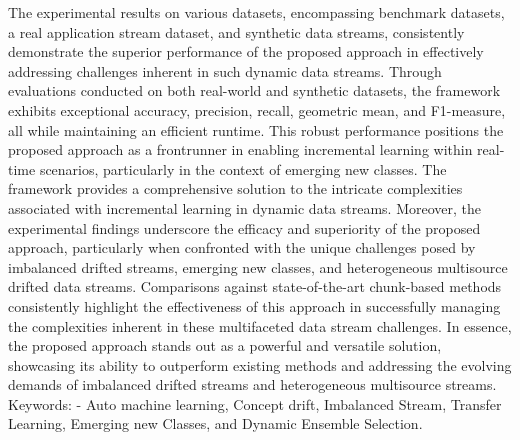 \begin{alwayssingle}
    The experimental results on various datasets, encompassing benchmark datasets, a real application stream dataset, and synthetic data streams, consistently demonstrate the superior performance of the proposed approach in effectively addressing challenges inherent in such dynamic data streams. Through evaluations conducted on both real-world and synthetic datasets, the framework exhibits exceptional accuracy, precision, recall, geometric mean, and F1-measure, all while maintaining an efficient runtime.
    This robust performance positions the proposed approach as a frontrunner in enabling incremental learning within real-time scenarios, particularly in the context of emerging new classes. The framework provides a comprehensive solution to the intricate complexities associated with incremental learning in dynamic data streams. Moreover, the experimental findings underscore the efficacy and superiority of the proposed approach, particularly when confronted with the unique challenges posed by imbalanced drifted streams, emerging new classes, and heterogeneous multisource drifted data streams.
    Comparisons against state-of-the-art chunk-based methods consistently highlight the effectiveness of this approach in successfully managing the complexities inherent in these multifaceted data stream challenges. In essence, the proposed approach stands out as a powerful and versatile solution, showcasing its ability to outperform existing methods and addressing the evolving demands of imbalanced drifted streams and heterogeneous multisource streams.
    Keywords: - Auto machine learning, Concept drift, Imbalanced Stream, Transfer Learning, Emerging new Classes, and Dynamic Ensemble Selection.
    
\end{alwayssingle}




%
%



